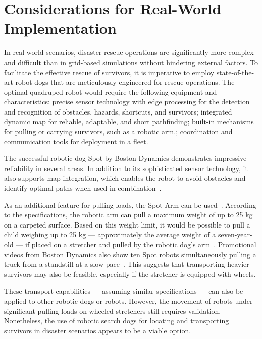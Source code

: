 \documentclass[3p,times,procedia]{elsarticle}
\begin{document}
\section{Considerations for Real-World Implementation}
\label{sec:real_world_example}

In real-world scenarios, disaster rescue operations are significantly more complex and difficult than in grid-based simulations without hindering external factors.
To facilitate the effective rescue of survivors, it is imperative to employ state-of-the-art robot dogs that are meticulously engineered for rescue operations.
The optimal quadruped robot would require the following equipment and characteristics: precise sensor technology with edge processing for the detection and recognition of obstacles, hazards, shortcuts, and survivors; integrated dynamic map for reliable, adaptable, and short pathfinding; built-in mechanisms for pulling or carrying survivors, such as a robotic arm.; coordination and communication tools for deployment in a fleet.

The successful robotic dog Spot by Boston Dynamics demonstrates impressive reliability in several areas. 
In addition to its sophisticated sensor technology, it also supports map integration, which enables the robot to avoid obstacles and identify optimal paths when used in combination\ \cite{boston_dynamics_2025_navigation,koval2022navigation}.

As an additional feature for pulling loads, the Spot Arm can be used\ \cite{boston_dynamics_2024_spot_arm}.
According to the specifications, the robotic arm can pull a maximum weight of up to 25 kg on a carpeted surface. 
Based on this weight limit, it would be possible to pull a child weighing up to 25 kg — approximately the average weight of a seven-year-old — if placed on a stretcher and pulled by the robotic dog’s arm\ \cite{stolzenberg2007koerpermasse}.
Promotional videos from Boston Dynamics also show ten Spot robots simultaneously pulling a truck from a standstill at a slow pace\ \cite{boston_dynamics_2019_spotmini_truck}.
This suggests that transporting heavier survivors may also be feasible, especially if the stretcher is equipped with wheels.

These transport capabilities — assuming similar specifications — can also be applied to other robotic dogs or robots. 
However, the movement of robots under significant pulling loads on wheeled stretchers still requires validation.
Nonetheless, the use of robotic search dogs for locating and transporting survivors in disaster scenarios appears to be a viable option.
\end{document}
